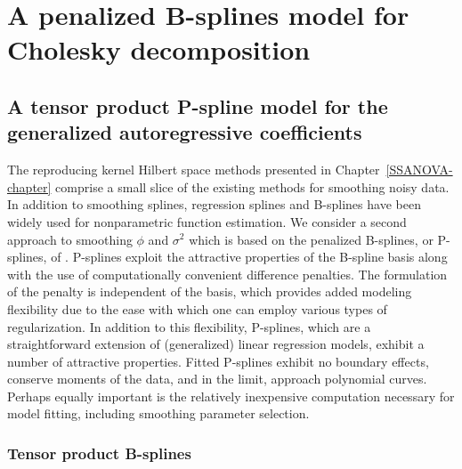 
\chapter{A penalized B-splines model for Cholesky decomposition} \label{psplines-chapter}

\section{A tensor product P-spline model for the generalized autoregressive coefficients}


The reproducing kernel Hilbert space methods presented in Chapter~\ref{SSANOVA-chapter} comprise a small slice of the existing methods for smoothing noisy data. In addition to smoothing splines, regression splines \cite{eubank1999nonparametric} and B-splines \cite{de1978practical}  have been widely used for nonparametric function estimation. We consider a second approach to smoothing $\phi$ and $\sigma^2$ which is based on the penalized B-splines, or P-splines, of \cite{eilers1996flexible}. P-splines exploit the attractive properties of the B-spline basis along with the use of computationally convenient difference penalties. The formulation of the penalty is independent of the basis, which provides added modeling flexibility due to the ease with which one can employ various types of regularization. In addition to this flexibility, P-splines, which are a straightforward extension of (generalized) linear regression models, exhibit a number of attractive properties. Fitted P-splines exhibit no boundary effects, conserve moments of the data, and in the limit, approach polynomial curves. Perhaps equally important is the relatively inexpensive computation necessary for model fitting, including smoothing parameter selection.

\subsection{Tensor product B-splines}


